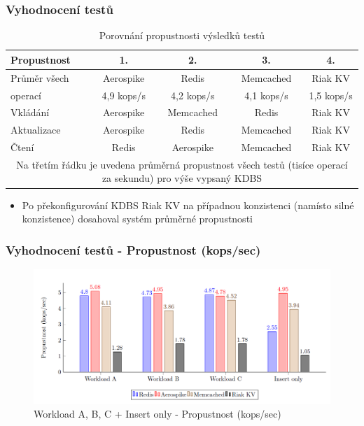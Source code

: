 \documentclass{beamer}
\begin{document}
	\begin{frame}
		\frametitle{Vyhodnocení testů}
		\begin{table}
			\centering
			\begin{tabular}{ l | c c c c }
				\hline
				Propustnost & 1. & 2. & 3. & 4. \\
				\hline
				Průměr všech & Aerospike & Redis & Memcached & Riak KV \\
				operací & 4,9 kops/s & 4,2 kops/s & 4,1 kops/s & 1,5 kops/s\\
				Vkládání & Aerospike & Memcached & Redis & Riak KV \\
				Aktualizace & Aerospike & Redis & Memcached & Riak KV \\
				Čtení & Redis & Aerospike & Memcached & Riak KV \\
				\hline
				\multicolumn{5}{c}{\tiny Na třetím řádku je uvedena průměrná propustnost všech testů (tisíce operací za sekundu) pro výše vypsaný KDBS} \\
			\end{tabular}
			\caption{Porovnání propustnosti výsledků testů}
		\end{table}
	
		\begin{itemize}
			\item Po překonfigurování KDBS Riak KV na případnou konzistenci (namísto silné konzistence) dosahoval systém průměrné propustnosti 
		\end{itemize}
	\end{frame}

	\begin{frame}
		\frametitle{Vyhodnocení testů - Propustnost (kops/sec)}
		\begin{figure}
			\centering
			\includegraphics[scale=0.43]{Figures/graf_prop.PNG}
			\caption{Workload A, B, C + Insert only - Propustnost (kops/sec)}
		\end{figure}
	\end{frame}
\end{document}
